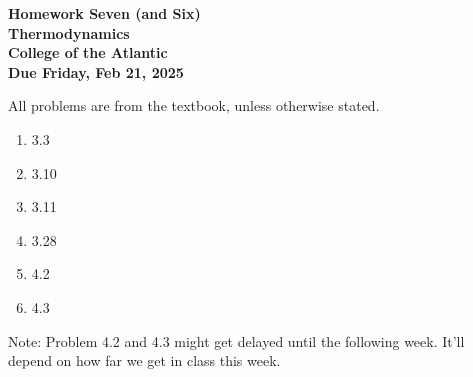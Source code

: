 \documentclass[12pt]{article}
\begin{document}
\pagestyle{empty}
 
\begin{center}
{\LARGE {\bf Homework Seven (and Six)}}\\
\medskip
{\Large {\bf Thermodynamics}}\\
\medskip
{\Large {\bf College of the Atlantic}}\\
\medskip
{ {\bf Due Friday, Feb 21, 2025}}\\  
\end{center}
\medskip


\noindent All problems are from the textbook, unless otherwise stated. 


\begin{enumerate}
  \setlength{\itemsep}{4mm}

\item 3.3
\item 3.10
\item 3.11
\item 3.28
\item 4.2
\item 4.3
   
\end{enumerate}

Note: Problem 4.2 and 4.3 might get delayed until the following
week. It'll depend on how far we get in class this week.
\end{document}

